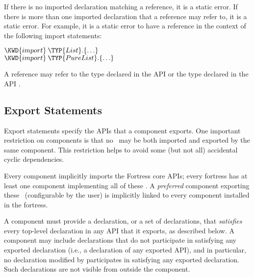 If there is no imported declaration matching a reference, it is a static error.
If there is more than one imported declaration that a reference may refer to,
it is a static error.
For example, it is a static error to have a reference 
in the context of the following import statements:
\begin{Fortress}
\(\KWD{import}\:\TYP{List}.\{\ldots\}\)\\
\(\KWD{import}\:\TYP{PureList}.\{\ldots\}\)
\end{Fortress}
A reference  may refer to
the type  declared in the API  or
the type  declared in the API .

\subsection{Export Statements}

Export statements specify the APIs that a component exports.
One important restriction on components is that no \apiN\ may be both
imported and exported by the same component. This restriction helps to
avoid some (but not all) accidental cyclic dependencies.

Every component implicitly imports the Fortress core APIs;
every fortress has at least one component implementing all of these \apisN.
A \emph{preferred} component exporting these \apisN\ (configurable by the user)
is implicitly linked to
every component installed in the fortress.


A component must provide a declaration, or a set of declarations,
that \emph{satisfies} every top-level declaration in any API
that it exports, as described below.
A component may include declarations
that do not participate in satisfying any exported declaration
(i.e., a declaration of any exported API), and in particular,
no declaration modified by 
participates in satisfying any exported declaration.
Such declarations are not visible from outside the component.


